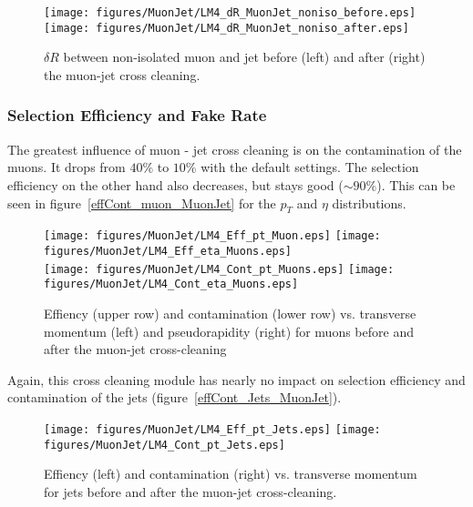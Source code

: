 \documentclass{cmspaper}
\begin{document}
\begin{figure}[hb]
\begin{center}
    \texttt{[image: figures/MuonJet/LM4\_dR\_MuonJet\_noniso\_before.eps]}
    \texttt{[image: figures/MuonJet/LM4\_dR\_MuonJet\_noniso\_after.eps]}
    \caption{\(\delta R\) between non-isolated muon and jet before (left) and
    after (right) the muon-jet cross cleaning.}
\label{fig:dR_MuonJet_noniso}
\end{center}
\end{figure}

\subsubsection{Selection Efficiency and Fake Rate}
The greatest influence of muon - jet cross cleaning is on the contamination of
the muons. It drops from \(40 \%\) to \(10 \%\) with the default settings. The
selection efficiency on the other hand also decreases, but stays good (\(\sim
90\%\)). This can be seen in figure~\ref{effCont_muon_MuonJet} for the \(p_T\)
and \(\eta\) distributions. 

\begin{figure}[hb]
\begin{center}
    \texttt{[image: figures/MuonJet/LM4\_Eff\_pt\_Muon.eps]}
    \texttt{[image: figures/MuonJet/LM4\_Eff\_eta\_Muons.eps]}\\
    \texttt{[image: figures/MuonJet/LM4\_Cont\_pt\_Muons.eps]}
    \texttt{[image: figures/MuonJet/LM4\_Cont\_eta\_Muons.eps]}
    \caption{Effiency (upper row) and contamination (lower row) vs. transverse
    momentum (left) and pseudorapidity (right) for muons before and after the
    muon-jet cross-cleaning}
\label{fig:effCont_muon_MuonJet}
\end{center}
\end{figure}

Again, this cross cleaning module has nearly no impact on selection efficiency
and contamination of the jets (figure~\ref{effCont_Jets_MuonJet}).

\begin{figure}[hb]
\begin{center}
    \texttt{[image: figures/MuonJet/LM4\_Eff\_pt\_Jets.eps]}
    \texttt{[image: figures/MuonJet/LM4\_Cont\_pt\_Jets.eps]}
    \caption{Effiency (left) and contamination (right) vs. transverse momentum
    for jets before and after the muon-jet cross-cleaning.}
\label{fig:effCont_Jets_MuonJet}
\end{center}
\end{figure}
\end{document}
